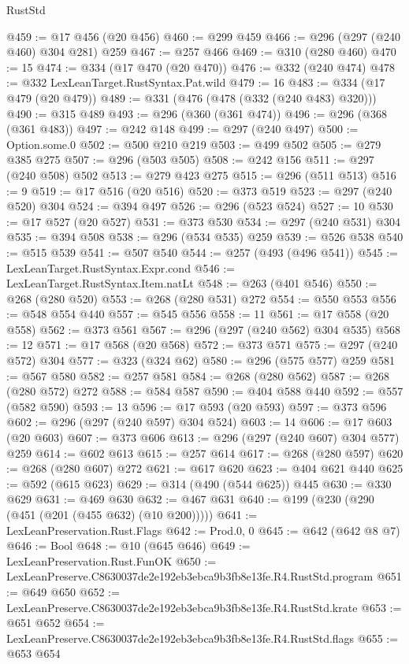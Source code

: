 \begin{lexlean}{RustStd}
\begin{coremodule}
@459 := @17 @456 (@20 @456)
@460 := @299 @459
@466 := @296 (@297 (@240 @460) @304 @281) @259
@467 := @257 @466
@469 := @310 (@280 @460)
@470 := 15
@474 := @334 (@17 @470 (@20 @470))
@476 := @332 (@240 @474)
@478 := @332 LexLeanTarget.RustSyntax.Pat.wild
@479 := 16
@483 := @334 (@17 @479 (@20 @479))
@489 := @331 (@476 (@478 (@332 (@240 @483) @320)))
@490 := @315 @489
@493 := @296 (@360 (@361 @474))
@496 := @296 (@368 (@361 @483))
@497 := @242 @148
@499 := @297 (@240 @497)
@500 := Option.some.{0}
@502 := @500 @210 @219
@503 := @499 @502
@505 := @279 @385 @275
@507 := @296 (@503 @505)
@508 := @242 @156
@511 := @297 (@240 @508) @502
@513 := @279 @423 @275
@515 := @296 (@511 @513)
@516 := 9
@519 := @17 @516 (@20 @516)
@520 := @373 @519
@523 := @297 (@240 @520) @304
@524 := @394 @497
@526 := @296 (@523 @524)
@527 := 10
@530 := @17 @527 (@20 @527)
@531 := @373 @530
@534 := @297 (@240 @531) @304
@535 := @394 @508
@538 := @296 (@534 @535) @259
@539 := @526 @538
@540 := @515 @539
@541 := @507 @540
@544 := @257 (@493 (@496 @541))
@545 := LexLeanTarget.RustSyntax.Expr.cond
@546 := LexLeanTarget.RustSyntax.Item.natLt
@548 := @263 (@401 @546)
@550 := @268 (@280 @520)
@553 := @268 (@280 @531) @272
@554 := @550 @553
@556 := @548 @554 @440
@557 := @545 @556
@558 := 11
@561 := @17 @558 (@20 @558)
@562 := @373 @561
@567 := @296 (@297 (@240 @562) @304 @535)
@568 := 12
@571 := @17 @568 (@20 @568)
@572 := @373 @571
@575 := @297 (@240 @572) @304
@577 := @323 (@324 @62)
@580 := @296 (@575 @577) @259
@581 := @567 @580
@582 := @257 @581
@584 := @268 (@280 @562)
@587 := @268 (@280 @572) @272
@588 := @584 @587
@590 := @404 @588 @440
@592 := @557 (@582 @590)
@593 := 13
@596 := @17 @593 (@20 @593)
@597 := @373 @596
@602 := @296 (@297 (@240 @597) @304 @524)
@603 := 14
@606 := @17 @603 (@20 @603)
@607 := @373 @606
@613 := @296 (@297 (@240 @607) @304 @577) @259
@614 := @602 @613
@615 := @257 @614
@617 := @268 (@280 @597)
@620 := @268 (@280 @607) @272
@621 := @617 @620
@623 := @404 @621 @440
@625 := @592 (@615 @623)
@629 := @314 (@490 (@544 @625)) @445
@630 := @330 @629
@631 := @469 @630
@632 := @467 @631
@640 := @199 (@230 (@290 (@451 (@201 (@455 @632) (@10 @200)))))
@641 := LexLeanPreservation.Rust.Flags
@642 := Prod.{0, 0}
@645 := @642 (@642 @8 @7)
@646 := Bool
@648 := @10 (@645 @646)
@649 := LexLeanPreservation.Rust.FunOK
@650 := LexLeanPreserve.C8630037de2e192eb3ebca9b3fb8e13fe.R4.RustStd.program
@651 := @649 @650
@652 := LexLeanPreserve.C8630037de2e192eb3ebca9b3fb8e13fe.R4.RustStd.krate
@653 := @651 @652
@654 := LexLeanPreserve.C8630037de2e192eb3ebca9b3fb8e13fe.R4.RustStd.flags
@655 := @653 @654

\end{coremodule}
\end{lexlean}
